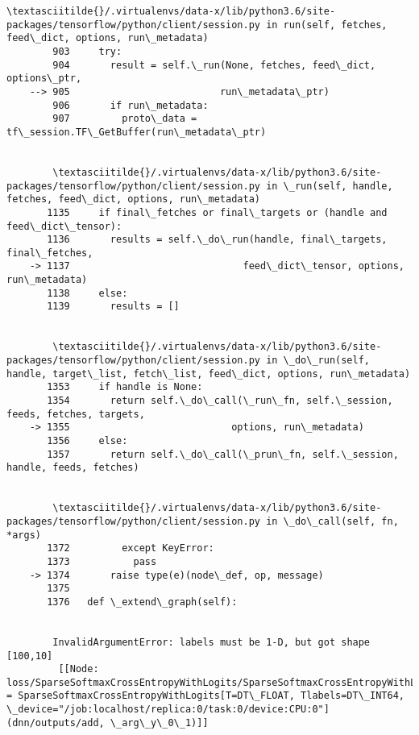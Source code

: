 \documentclass[11pt]{article}
\begin{document}
\begin{Verbatim}[commandchars=\\\{\}]
        \textasciitilde{}/.virtualenvs/data-x/lib/python3.6/site-packages/tensorflow/python/client/session.py in run(self, fetches, feed\_dict, options, run\_metadata)
        903     try:
        904       result = self.\_run(None, fetches, feed\_dict, options\_ptr,
    --> 905                          run\_metadata\_ptr)
        906       if run\_metadata:
        907         proto\_data = tf\_session.TF\_GetBuffer(run\_metadata\_ptr)


        \textasciitilde{}/.virtualenvs/data-x/lib/python3.6/site-packages/tensorflow/python/client/session.py in \_run(self, handle, fetches, feed\_dict, options, run\_metadata)
       1135     if final\_fetches or final\_targets or (handle and feed\_dict\_tensor):
       1136       results = self.\_do\_run(handle, final\_targets, final\_fetches,
    -> 1137                              feed\_dict\_tensor, options, run\_metadata)
       1138     else:
       1139       results = []


        \textasciitilde{}/.virtualenvs/data-x/lib/python3.6/site-packages/tensorflow/python/client/session.py in \_do\_run(self, handle, target\_list, fetch\_list, feed\_dict, options, run\_metadata)
       1353     if handle is None:
       1354       return self.\_do\_call(\_run\_fn, self.\_session, feeds, fetches, targets,
    -> 1355                            options, run\_metadata)
       1356     else:
       1357       return self.\_do\_call(\_prun\_fn, self.\_session, handle, feeds, fetches)


        \textasciitilde{}/.virtualenvs/data-x/lib/python3.6/site-packages/tensorflow/python/client/session.py in \_do\_call(self, fn, *args)
       1372         except KeyError:
       1373           pass
    -> 1374       raise type(e)(node\_def, op, message)
       1375 
       1376   def \_extend\_graph(self):


        InvalidArgumentError: labels must be 1-D, but got shape [100,10]
    	 [[Node: loss/SparseSoftmaxCrossEntropyWithLogits/SparseSoftmaxCrossEntropyWithLogits = SparseSoftmaxCrossEntropyWithLogits[T=DT\_FLOAT, Tlabels=DT\_INT64, \_device="/job:localhost/replica:0/task:0/device:CPU:0"](dnn/outputs/add, \_arg\_y\_0\_1)]]
    

\end{Verbatim}
\end{document}

